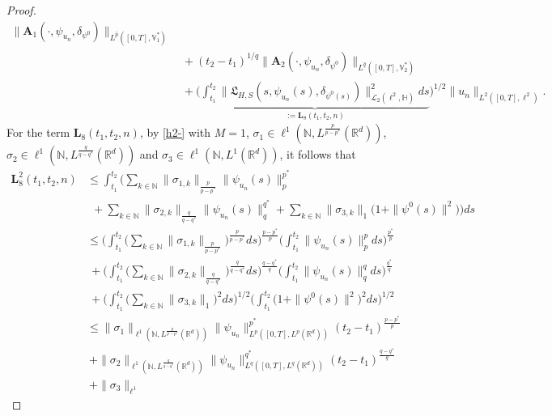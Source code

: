 \documentclass[11pt]{article}
\renewcommand{\leq}{\leqslant}
\numberwithin{equation}{section}
\begin{document}
\begin{proof}
\begin{align}
\|\mathbf{A}_1(\cdot,\psi_{u_n},
\delta_{\psi^0})\|_{L^{\widehat{p}}([0,T], \mathbb{V}^*_1)}
\nonumber\\&\ +(t_2-t_1)^{1/q}
\|\mathbf{A}_2(\cdot,\psi_{u_n},
\delta_{\psi^0})\|_{L^{\widehat{q}}([0,T], \mathbb{V}^*_2)}
\nonumber\\&\
 + \bigg(\underbrace{\int_{t_1}^{t_2}\|
 \mathfrak{L}_{H,S}(s,\psi_{u_n}(s),
\delta_{\psi^0(s)})\|_{\mathcal{L}_2(\ell^2
 ,\mathbb{H})}^2ds
}_{:=\textbf{L}_8(t_1,t_2,n)}\bigg)^{1/2}
\|u_n
\|_{L^2([0,T],
\ell^2)}.
\end{align}
For the term $\textbf{L}_8(t_1,t_2,n)$, by \eqref{h2-} with $M=1$,
$\sigma_1
 \in \ell^1
 (\mathbb{N},L^{\frac{p}{p-p^*}}(\mathbb{R}^d))$,
$\sigma_2
 \in
 \ell^1
 (\mathbb{N},L^{\frac{q}{q-q^*}}(\mathbb{R}^d))$ and
$\sigma_3
 \in
 \ell^1
 (\mathbb{N},L^1(\mathbb{R}^d))$, it follows that
\begin{align} \label{weak6-}
\textbf{L}^2_8(t_1,t_2,n)
&\leq
 \int_{t_1}^{t_2}\Bigg(
 \sum_{k\in\mathbb{N}}
 \|\sigma_{1,k} \|
 _{\frac p{p-p^*}}
 \|\psi_{u_n}(s)\|^{p^*}_{p}
\nonumber\\
 &  \ \ +
 \sum_{k\in\mathbb{N}}\|\sigma_{2,k} \|
 _{\frac q{q-q^*} }
  \| \psi_{u_n}(s)\|^{q^*}_{q}
  +
 \sum_{k\in\mathbb{N}}\|\sigma_{3,k}\|
 _{1}\big(1+\|\psi^0(s)\|^2\big)\Bigg)ds
\nonumber\\
 &\leq
 \Bigg(\int_{t_1}^{t_2} \bigg(\sum_{k\in\mathbb{N}}
 \|\sigma_{1,k} \|
 _{\frac p{p-p^*}}\bigg)^{\frac{p}{p-p^*}}ds
 \Bigg)^{\frac{p-p^*}{p}}
 \Bigg(\int_{t_1}^{t_2} \|\psi_{u_n}(s)\|^{p}_{p}ds
 \Bigg)^{\frac{p^*}{p}}
\nonumber\\
 &\ +
  \Bigg(\int_{t_1}^{t_2} \bigg(\sum_{k\in\mathbb{N}}
 \|\sigma_{2,k}\|
 _{\frac q{q-q^*}}\bigg)^{\frac{q}{q-q^*}}ds
 \Bigg)^{\frac{q-q^*}{q}}
 \Bigg(\int_{t_1}^{t_2} \|\psi_{u_n}(s)\|^{q}_{q}ds
 \Bigg)^{\frac{q^*}{q}}
\nonumber\\
 &\ +
  \Bigg(\int_{t_1}^{t_2} \bigg(\sum_{k\in\mathbb{N}}
 \|\sigma_{3,k} \|
 _{1}\bigg)^{2}ds
 \Bigg)^{1/2}
 \Bigg(\int_{t_1}^{t_2} \big(1+\|\psi^0(s)\|^2\big)^2ds
 \Bigg)^{1/2}
\nonumber\\
 &\leq
 \|\sigma_1\|_{
 \ell^1
 (\mathbb{N},L^{\frac{p}{p-p^*}}(\mathbb{R}^d))}
\|\psi_{u_n}\|^{p^*}_{L^p([0,T], L^p(\mathbb{R}^d))}(t_2-t_1)^{\frac{p-p^*}{p}}
\nonumber\\
 &\ +
 \|\sigma_2\|_{
 \ell^1
 (\mathbb{N},L^{\frac{q}{q-q^*}}(\mathbb{R}^d))}
\|\psi_{u_n}\|^{q^*}_{L^q([0,T], L^q(\mathbb{R}^d))}(t_2-t_1)^{\frac{q-q^*}{q}}
\nonumber\\
 &\ + \|\sigma_3
 \|_{
 \ell^1
}
\end{align}
\end{proof}
\end{document}
